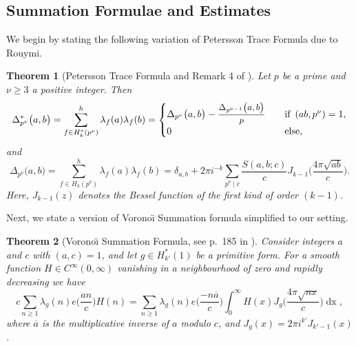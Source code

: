 \documentclass[12pt]{amsart}
\theoremstyle{plain}
\newtheorem{thm}{Theorem}[section]
\theoremstyle{definition}
\newcommand{\sdfrac}[2]{\mbox{\small$\displaystyle\frac{#1}{#2}$}}
\begin{document}


\subsection{Summation Formulae and Estimates}
We begin by stating the following variation of Petersson Trace Formula due to Rouymi.


\begin{thm}[Petersson Trace Formula and Remark 4 of \cite{Rouymi}]\label{Rouymi}
Let $p$ be a prime and $\nu\geq 3$ a positive integer. Then
    \[
    \Delta^*_{p^\nu}\big( a, b\big)
    =
    \sum_{f \in H^*_k(p^\nu)}^{h} \lambda_f(a) \lambda_f(b)
    =
    \begin{cases}
    \Delta_{p^\nu}\big( a, b\big) 
    -\sdfrac{\Delta_{p^{\nu-1}}\big( a, b\big)}{p} 
    \quad &\text{if } \, (ab, p^\nu)=1, \\
    0 \quad &\text{else},
    \end{cases}
    \]
and
    \[
    \Delta_{p^\nu}\big( a, b\big) 
    = \sum_{f \in H_k(p^\nu)}^{h} \lambda_f(a) \lambda_f(b) 
    = \delta_{a, b} +
    2\pi i^{-k} \sum_{p^\nu \mid c} \frac{S(a, b; c)}{c}
    J_{k-1}\Big(\frac{4\pi \sqrt{ab}}{c} \Big).
    \]
Here,  $J_{k-1}(z)$ denotes the Bessel function of the first kind of order $(k-1)$.
\end{thm}




Next, we state a version of Vorono\"{\i} Summation formula simplified to our setting.

\begin{thm}[Vorono\"{\i} Summation Formula, see p.~185 in \cite{KMV RS}]
 \label{Voronoi}
Consider integers $a$ and $c$ with $(a, c)=1$, and let $g \in H^*_{k'}(1)$ be a primitive form. For a smooth function $H\in C^\infty(0,\infty)$ vanishing in a neighbourhood of zero and rapidly decreasing we have
    \[
    c\sum_{n \geq 1}
    \lambda_g(n) e\Big(\frac{an}{c}\Big) H(n)
    = 
     \sum_{n\geq 1} \lambda_{g}(n) e\Big(\frac{-n\overline{a}}{c}\Big)
    \int_0^\infty H(x)  J_{g}\Big(\frac{4\pi\sqrt{nx}}{c}\Big)\mathop{dx},
    \]
    where $\overline{a}$ is the multiplicative inverse of $a$ modulo $c$, and 
$J_g(x)= 2\pi i^{k'} J_{k'-1}(x)$.

\end{thm}


\end{document}
